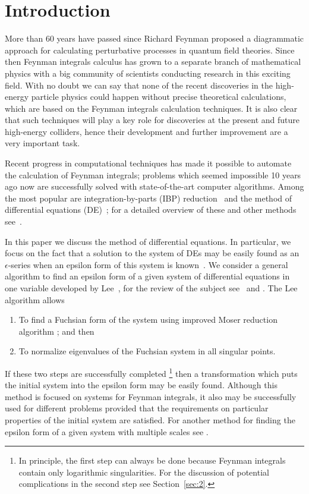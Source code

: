 \documentclass{elsarticle}
\newcommand{\eps}{\epsilon}
\begin{document}

\section{Introduction}

More than 60 years have passed since Richard Feynman proposed a diagrammatic approach for calculating perturbative processes in quantum field theories.
Since then Feynman integrals calculus has grown to a separate branch of mathematical physics with a big community of scientists conducting research in this exciting field.
With no doubt we can say that none of the recent discoveries in the high-energy particle physics could happen without precise theoretical calculations, which are based on the Feynman integrals calculation techniques. 
It is also clear that such techniques will play a key role for discoveries at the present and future high-energy colliders, hence their development and further improvement are a very important task.

Recent progress in computational techniques has made it possible to automate the calculation of Feynman integrals; problems which seemed impossible 10 years ago now are successfully solved with state-of-the-art computer algorithms.
Among the most popular are integration-by-parts (IBP) reduction~\cite{CT81} and the method of differential equations (DE)~\cite{Kot91a,Kot91b,Kot91c}; for a detailed overview of these and other methods see~\cite{Smi06}.

In this paper we discuss the method of differential equations.
In particular, we focus on the fact that a solution to the system of DEs may be easily found as an $\eps$-series when an epsilon form of this system is known~\cite{Henn13}.
We consider a general algorithm to find an epsilon form of a given system of differential equations in one variable developed by Lee~\cite{Lee15}, for the review of the subject see~\cite{Henn14} and \cite{Pap14,Tan15,ABB15}.
The Lee algorithm allows
\begin{enumerate}
  \item To find a Fuchsian form of the system using improved Moser reduction algorithm \cite{Mos59}; and then
  \item To normalize eigenvalues of the Fuchsian system in all singular points.
\end{enumerate}
If these two steps are successfully completed%
\footnote{In principle, the first step can always be done because Feynman integrals contain only logarithmic singularities. For the discussion of potential complications in the second step see Section~\ref{sec:2}.}
then a transformation which puts the initial system into the epsilon form may be easily found.
Although this method is focused on systems for Feynman integrals, it also may be successfully used for different problems provided that the requirements on particular properties of the initial system are satisfied.
For another method for finding the epsilon form of a given system with multiple scales see \cite{Mey16a,Mey16b}.
\end{document}
